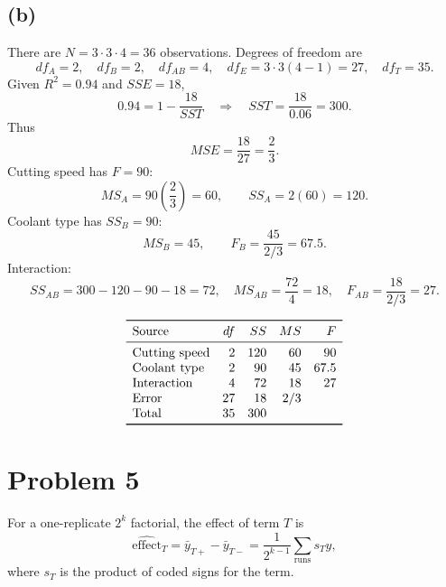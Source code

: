 \documentclass[11pt]{article}
\begin{document}
\subsection*{(b)}
There are \(N=3\cdot3\cdot4=36\) observations. Degrees of freedom are
\[
df_A=2,\quad df_B=2,\quad df_{AB}=4,\quad df_E=3\cdot3(4-1)=27,\quad df_T=35.
\]
Given \(R^2=0.94\) and \(SSE=18\),
\[
0.94=1-\frac{18}{SST}\quad\Rightarrow\quad SST=\frac{18}{0.06}=300.
\]
Thus
\[
MSE=\frac{18}{27}=\frac{2}{3}.
\]
Cutting speed has \(F=90\):
\[
MS_A=90\left(\frac{2}{3}\right)=60,\qquad SS_A=2(60)=120.
\]
Coolant type has \(SS_B=90\):
\[
MS_B=45,\qquad F_B=\frac{45}{2/3}=67.5.
\]
Interaction:
\[
SS_{AB}=300-120-90-18=72,\quad
MS_{AB}=\frac{72}{4}=18,\quad
F_{AB}=\frac{18}{2/3}=27.
\]

\[
\begin{array}{lrrrr}
\toprule
\text{Source} & df & SS & MS & F\\
\midrule
\text{Cutting speed} & 2 & 120 & 60 & 90\\
\text{Coolant type} & 2 & 90 & 45 & 67.5\\
\text{Interaction} & 4 & 72 & 18 & 27\\
\text{Error} & 27 & 18 & 2/3 & \\
\text{Total} & 35 & 300 & & \\
\bottomrule
\end{array}
\]

\section*{Problem 5}

For a one-replicate \(2^k\) factorial, the effect of term \(T\) is
\[
\widehat{\text{effect}}_T=\bar y_{T+}-\bar y_{T-}
=\frac{1}{2^{k-1}}\sum_{\text{runs}}s_Ty,
\]
where \(s_T\) is the product of coded signs for the term.
\end{document}
